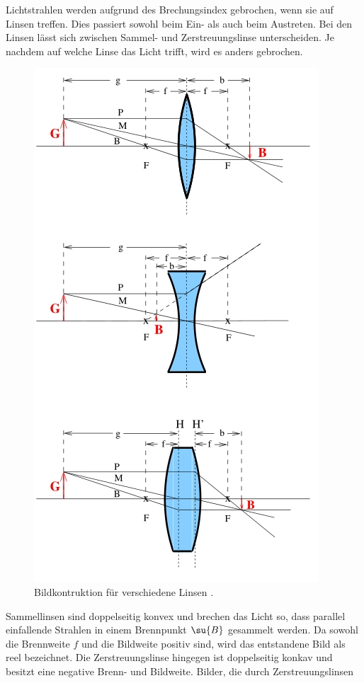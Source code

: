 Lichtstrahlen werden aufgrund des Brechungsindex gebrochen, wenn sie auf Linsen
treffen. Dies passiert sowohl beim Ein- als auch beim Austreten. Bei den Linsen
lässt sich zwischen Sammel- und Zerstreuungslinse unterscheiden. Je nachdem auf
welche Linse das Licht trifft, wird es anders gebrochen.
\begin{figure}
  \includegraphics{bilder/konstruktion.jpg}
  \caption{Bildkontruktion für verschiedene Linsen \cite{408}.}
  \label{fig:kons}
\end{figure}
Sammellinsen sind doppelseitig konvex und brechen das Licht so, dass parallel
einfallende Strahlen in einem Brennpunkt $\su{B}$ gesammelt werden. Da sowohl die
Brennweite $f$ und die Bildweite positiv sind, wird das entstandene Bild als
reel bezeichnet. Die Zerstreuungslinse hingegen ist doppelseitig konkav und
besitzt eine negative Brenn- und Bildweite. Bilder, die durch Zerstreuungslinsen
